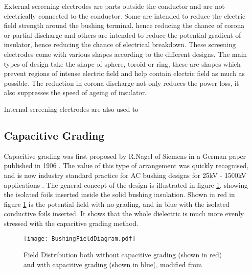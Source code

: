 External screening electrodes are parts outside the conductor and are not electrically connected to the conductor. Some are intended to reduce the electric field strength around the bushing terminal, hence reducing the chance of corona or partial discharge and others are intended to reduce the potential gradient of insulator, hence reducing the chance of electrical breakdown. These screening electrodes come with various shapes according to the different designs. The main types of design take the shape of sphere, toroid or ring, these are shapes which prevent regions of intense electric field and help contain electric field as much as possible. The reduction in corona discharge not only reduces the power loss, it also suppresses the speed of ageing of insulator.

Internal screening electrodes are also used to 
 

\subsection{Capacitive Grading} \label{ss:CapacitiveGrading}
Capacitive grading was first proposed by R.Nagel of Siemens in a German paper published in 1906 \cite{harlow2004electric}.
The value of this type of arrangement was quickly recognised, and is now industry standard practice for AC bushing designs for 25kV - 1500kV applications \cite{james2008condition}.
The general concept of the design is illustrated in figure \ref{figure:fieldgeneric}, showing the isolated foils inserted inside the solid bushing insulation.
Shown in red in figure \ref{figure:fieldgeneric} is the potential field with no grading, and in blue with the isolated conductive foils inserted.
It shows that the whole dielectric is much more evenly stressed with the capacitive grading method.
\begin{figure}[!h]
   \centering
   \texttt{[image: BushingFieldDiagram.pdf]}
   \caption{Field Distribution both without capacitive grading (shown in red) and with capacitive grading (shown in blue), modified from \cite{james2008condition}}
   \label{figure:fieldgeneric}
\end{figure}

